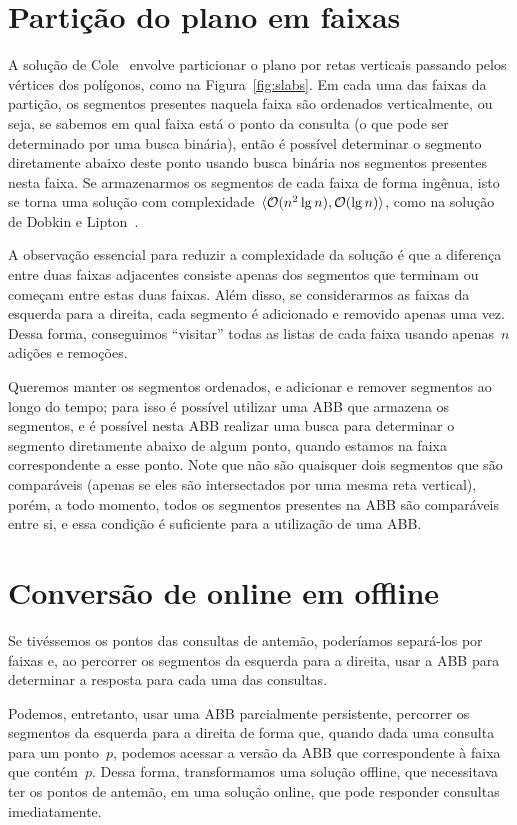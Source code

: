 \documentclass[main.tex]{subfiles}
\begin{document}
\section{Partição do plano em faixas}

A solução de Cole~\cite{Cole86} envolve particionar o plano por retas verticais passando pelos vértices dos polígonos, como na Figura~\ref{fig:slabs}. Em cada uma das faixas da partição, os segmentos presentes naquela faixa são ordenados verticalmente, ou seja, se sabemos em qual faixa está o ponto da consulta (o que pode ser determinado por uma busca binária), então é possível determinar o segmento diretamente abaixo deste ponto usando busca binária nos segmentos presentes nesta faixa.
Se armazenarmos os segmentos de cada faixa de forma ingênua, isto se torna uma solução com complexidade~$\langle\mathcal{O}(n^2 \lg n), \mathcal{O}(\lg n)\rangle$, como na solução de Dobkin e Lipton~\cite{DobkinL76}.

A observação essencial para reduzir a complexidade da solução é que a diferença entre duas faixas adjacentes consiste apenas dos segmentos que terminam ou começam entre estas duas faixas. Além disso, se considerarmos as faixas da esquerda para a direita, cada segmento é adicionado e removido apenas uma vez. Dessa forma, conseguimos ``visitar'' todas as listas de cada faixa usando apenas~$n$ adições e remoções.

Queremos manter os segmentos ordenados, e adicionar e remover segmentos ao longo do tempo; para isso é possível utilizar uma ABB que armazena os segmentos, e é possível nesta ABB realizar uma busca para determinar o segmento diretamente abaixo de algum ponto, quando estamos na faixa correspondente a esse ponto. Note que não são quaisquer dois segmentos que são comparáveis (apenas se eles são intersectados por uma mesma reta vertical), porém, a todo momento, todos os segmentos presentes na ABB são comparáveis entre si, e essa condição é suficiente para a utilização de uma ABB.

\section{Conversão de online em offline}

Se tivéssemos os pontos das consultas de antemão, poderíamos separá-los por faixas e, ao percorrer os segmentos da esquerda para a direita, usar a ABB para determinar a resposta para cada uma das consultas.

Podemos, entretanto, usar uma ABB parcialmente persistente, percorrer os segmentos da esquerda para a direita de forma que, quando dada uma consulta para um ponto~$p$, podemos acessar a versão da ABB que correspondente à faixa que contém~$p$. Dessa forma, transformamos uma solução offline, que necessitava ter os pontos de antemão, em uma solução online, que pode responder consultas imediatamente.
\end{document}
